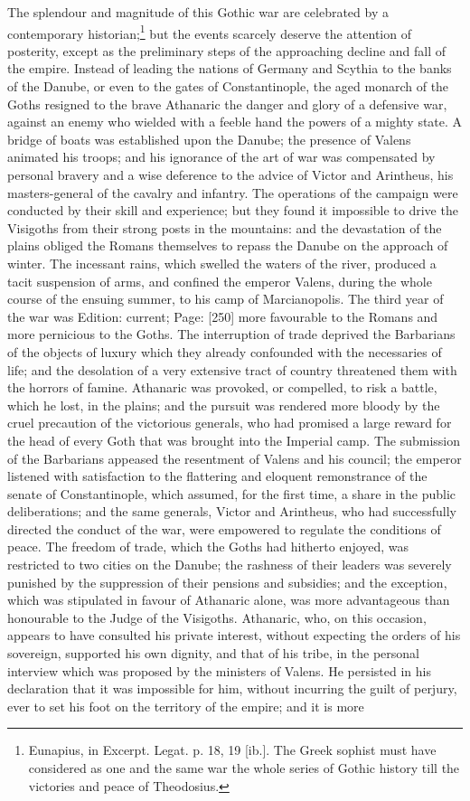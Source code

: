 The splendour and magnitude of this Gothic war are celebrated by a contemporary historian;\footnote{Eunapius, in Excerpt. Legat. p. 18, 19 [ib.]. The Greek sophist must have considered as one and the same war the whole series of Gothic history till the victories and peace of Theodosius.} but the events scarcely deserve the attention of posterity, except as the preliminary steps of the approaching decline and fall of the empire. Instead of leading the nations of Germany and Scythia to the banks of the Danube, or even to the gates of Constantinople, the aged monarch of the Goths resigned to the brave Athanaric the danger and glory of a defensive war, against an enemy who wielded with a feeble hand the powers of a mighty state. A bridge of boats was established upon the Danube; the presence of Valens animated his troops; and his ignorance of the art of war was compensated by personal bravery and a wise deference to the advice of Victor and Arintheus, his masters-general of the cavalry and infantry. The operations of the campaign were conducted by their skill and experience; but they found it impossible to drive the Visigoths from their strong posts in the mountains: and the devastation of the plains obliged the Romans themselves to repass the Danube on the approach of winter. The incessant rains, which swelled the waters of the river, produced a tacit suspension of arms, and confined the emperor Valens, during the whole course of the ensuing summer, to his camp of Marcianopolis. The third year of the war was Edition: current; Page: [250] more favourable to the Romans and more pernicious to the Goths. The interruption of trade deprived the Barbarians of the objects of luxury which they already confounded with the necessaries of life; and the desolation of a very extensive tract of country threatened them with the horrors of famine. Athanaric was provoked, or compelled, to risk a battle, which he lost, in the plains; and the pursuit was rendered more bloody by the cruel precaution of the victorious generals, who had promised a large reward for the head of every Goth that was brought into the Imperial camp. The submission of the Barbarians appeased the resentment of Valens and his council; the emperor listened with satisfaction to the flattering and eloquent remonstrance of the senate of Constantinople, which assumed, for the first time, a share in the public deliberations; and the same generals, Victor and Arintheus, who had successfully directed the conduct of the war, were empowered to regulate the conditions of peace. The freedom of trade, which the Goths had hitherto enjoyed, was restricted to two cities on the Danube; the rashness of their leaders was severely punished by the suppression of their pensions and subsidies; and the exception, which was stipulated in favour of Athanaric alone, was more advantageous than honourable to the Judge of the Visigoths. Athanaric, who, on this occasion, appears to have consulted his private interest, without expecting the orders of his sovereign, supported his own dignity, and that of his tribe, in the personal interview which was proposed by the ministers of Valens. He persisted in his declaration that it was impossible for him, without incurring the guilt of perjury, ever to set his foot on the territory of the empire; and it is more 